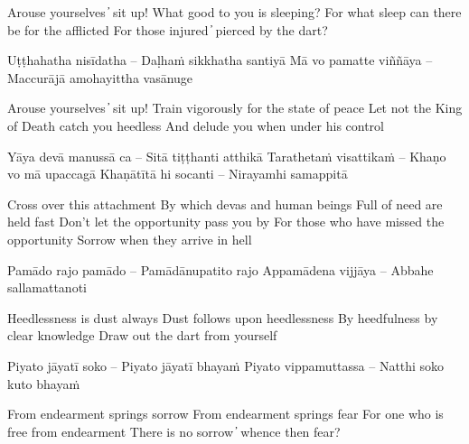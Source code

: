 \begin{english}
Arouse yourselves  ̓  sit up!
What good to you is sleeping?
For what sleep can there be for the afflicted
For those injured  ̓  pierced by the dart?
\end{english}

\begin{twochants}
Uṭṭhahatha nisīdatha – Daḷhaṁ sikkhatha santiyā
Mā vo pamatte viññāya – Maccurājā amohayittha vasānuge
\end{twochants}

\begin{english}
Arouse yourselves  ̓  sit up!
Train vigorously for the state of peace
Let not the King of Death catch you heedless
And delude you when under his control
\end{english}

\begin{twochants}
Yāya devā manussā ca – Sitā tiṭṭhanti atthikā
Tarathetaṁ visattikaṁ – Khaṇo vo mā upaccagā
Khaṇātītā hi socanti – Nirayamhi samappitā
\end{twochants}

\begin{english}
Cross over this attachment
By which devas and human beings
Full of need are held fast
Don’t let the opportunity pass you by
For those who have missed the opportunity
Sorrow when they arrive in hell
\end{english}

\begin{twochants}
Pamādo rajo pamādo – Pamādānupatito rajo
Appamādena vijjāya – Abbahe sallamattanoti
\end{twochants}

\begin{english}
Heedlessness is dust always
Dust follows upon heedlessness
By heedfulness by clear knowledge
Draw out the dart from yourself
\end{english}


\begin{twochants}
Piyato jāyatī soko – Piyato jāyatī bhayaṁ
Piyato vippamuttassa – Natthi soko kuto bhayaṁ
\end{twochants}

\begin{english}
From endearment springs sorrow
From endearment springs fear
For one who is free from endearment
There is no sorrow  ̓  whence then fear?
\end{english}

